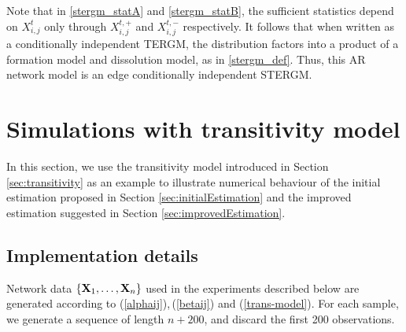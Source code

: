 \documentclass[12pt]{article}
\newcommand{\bvarsigma}{\boldsymbol \varsigma}
\newcommand{\bvarrho}{\boldsymbol \varrho}
\newcommand{\bpsi}{\boldsymbol \psi}
\newcommand{\bphi}{\boldsymbol \phi}
\newcommand{\btheta}{\boldsymbol \theta}
\newcommand{\bX}{{\bf X}}
\newcommand{\0}{{\bf 0}}
\begin{document}
Note that in \eqref{stergm_statA} and \eqref{stergm_statB}, the sufficient statistics depend on $X_{i,j}^t$ only through $X_{i,j}^{t,+}$ and $X_{i,j}^{t,-}$ respectively. 
It follows that when written as a conditionally independent TERGM, the distribution factors into a product of a formation model and dissolution model, as in \eqref{stergm_def}. 
Thus, this AR network model is an edge conditionally independent STERGM.




\section{Simulations with transitivity model} \label{sec:simulation}

In this section, we use the transitivity model introduced in Section \ref{sec:transitivity} as an example to illustrate numerical behaviour of the initial estimation proposed in Section \ref{sec:initialEstimation} and the improved estimation suggested in Section \ref{sec:improvedEstimation}.

\subsection{Implementation details}
\label{sec:impl.details}

Network data $\{\bX_1, \ldots, \bX_n\}$ used in the experiments described below are generated according to (\ref{alphaij}),\,(\ref{betaij}) and (\ref{trans-model}). %
For each sample, we generate a sequence of  length $n+200$, and discard the first 200 observations.
\end{document}
